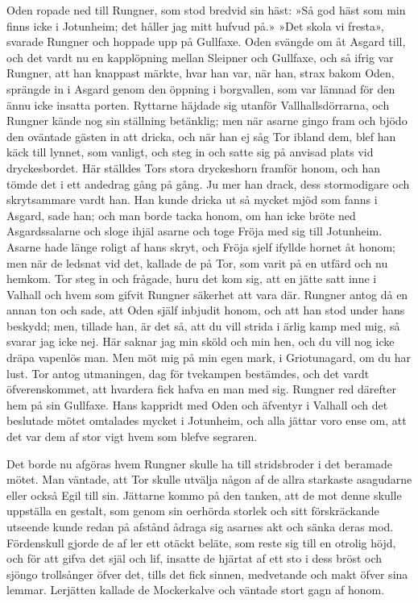 Oden ropade ned till Rungner, som stod bredvid sin häst: »Så god häst
som min finns icke i Jotunheim; det håller jag mitt hufvud på.» »Det
skola vi fresta», svarade Rungner och hoppade upp på Gullfaxe. Oden
svängde om åt Asgard till, och det vardt nu en kapplöpning mellan
Sleipner och Gullfaxe, och så ifrig var Rungner, att han knappast
märkte, hvar han var, när han, strax bakom Oden, sprängde in i
Asgard genom den öppning i borgvallen, som var lämnad för den ännu icke
insatta porten. Ryttarne häjdade sig utanför Vallhallsdörrarna, och
Rungner kände nog sin ställning betänklig; men när asarne gingo fram och
bjödo den oväntade gästen in att dricka, och när han ej såg Tor ibland
dem, blef han käck till lynnet, som vanligt, och steg in och satte sig
på anvisad plats vid dryckesbordet. Här ställdes Tors stora dryckeshorn
framför honom, och han tömde det i ett andedrag gång på gång. Ju mer han
drack, dess stormodigare och skrytsammare vardt han. Han kunde dricka ut
så mycket mjöd som fanns i Asgard, sade han; och man borde tacka honom,
om han icke bröte ned Asgardssalarne och sloge ihjäl asarne och toge
Fröja med sig till Jotunheim. Asarne hade länge roligt af hans skryt,
och Fröja sjelf ifyllde hornet åt honom; men när de ledsnat vid det,
kallade de på Tor, som varit på en utfärd och nu hemkom. Tor steg in och
frågade, huru det kom sig, att en jätte satt inne i Valhall och hvem som
gifvit Rungner säkerhet att vara där. Rungner antog då en annan ton och
sade, att Oden själf inbjudit honom, och att han stod under hans
beskydd; men, tillade han, är det så, att du vill strida i ärlig kamp
med mig, så svarar jag icke nej. Här saknar jag min sköld och min hen,
och du vill nog icke dräpa vapenlös man. Men möt mig på min egen mark, i
Griotunagard, om du har lust. Tor antog utmaningen, dag för tvekampen
bestämdes, och det vardt öfverenskommet, att hvardera fick hafva en man
med sig. Rungner red därefter hem på sin Gullfaxe. Hans kappridt med
Oden och äfventyr i Valhall och det beslutade mötet omtalades mycket i
Jotunheim, och alla jättar voro ense om, att det var dem af stor vigt
hvem som blefve segraren.

Det borde nu afgöras hvem Rungner skulle ha till stridsbroder i det
beramade mötet. Man väntade, att Tor skulle utvälja någon af de allra
starkaste asagudarne eller också Egil till sin. Jättarne kommo på den
tanken, att de mot denne skulle uppställa en gestalt, som genom sin
oerhörda storlek och sitt förskräckande utseende kunde redan på
afstånd
ådraga sig asarnes akt och sänka deras mod. Fördenskull gjorde de af ler
ett otäckt beläte, som reste sig till en otrolig höjd, och för att gifva
det själ och lif, insatte de hjärtat af ett sto i dess bröst och sjöngo
trollsånger öfver det, tills det fick sinnen, medvetande och makt öfver
sina lemmar. Lerjätten kallade de Mockerkalve och väntade stort gagn af
honom.

